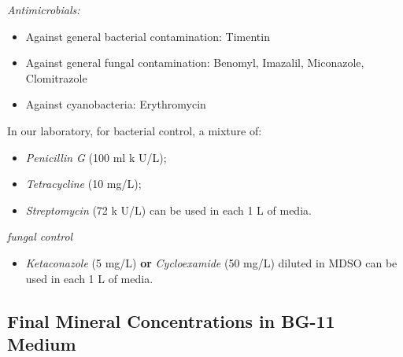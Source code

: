 \documentclass[
  11pt,
]{article}
\providecommand{\tightlist}{%
  \setlength{\itemsep}{0pt}\setlength{\parskip}{0pt}}
\begin{document}
\emph{Antimicrobials:}

\begin{itemize}
\tightlist
\item
  Against general bacterial contamination: Timentin
\item
  Against general fungal contamination: Benomyl, Imazalil, Miconazole,
  Clomitrazole
\item
  Against cyanobacteria: Erythromycin
\end{itemize}

In our laboratory, for bacterial control, a mixture of:

\begin{itemize}
\tightlist
\item
  \emph{Penicillin G} (100 ml k U/L);
\item
  \emph{Tetracycline} (10 mg/L);
\item
  \emph{Streptomycin} (72 k U/L) can be used in each 1 L of media.
\end{itemize}

\emph{fungal control}

\begin{itemize}
\tightlist
\item
  \emph{Ketaconazole} (5 mg/L) \textbf{or} \emph{Cycloexamide} (50 mg/L)
  diluted in MDSO can be used in each 1 L of media.
\end{itemize}

\subsection{Final Mineral Concentrations in BG-11
Medium}\label{final-mineral-concentrations-in-bg-11-medium}
\end{document}
